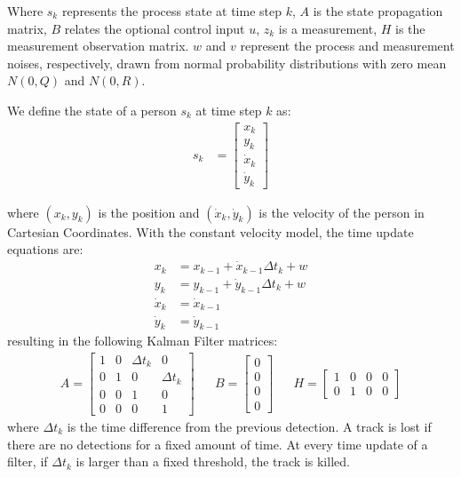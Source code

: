 Where $s_k$ represents the process state at time step $k$, $A$ is the state propagation matrix, $B$ relates the optional control input $u$, $z_k$ is a measurement, $H$ is the measurement observation matrix. $w$ and $v$ represent the process and measurement noises, respectively, drawn from normal probability distributions with zero mean $N(0,Q)$ and $N(0,R)$.

We define the state of a person $s_k$ at time step $k$ as:
\begin{align}
s_k & =
\begin{bmatrix} 
 x_k \\ 
 y_k\\
 \dot{x}_{k} \\
 \dot{y}_{k}
\end{bmatrix}
\end{align}

where $(x_k,y_k)$ is the position and $(\dot{x}_{k}, \dot{y}_{k})$ is the velocity of the person in Cartesian Coordinates. With the constant velocity model, the time update equations are:
\begin{align}
x_k&=x_{k-1}+\dot{x}_{k-1} \Delta t_k + w\\
y_k&=y_{k-1}+\dot{y}_{k-1} \Delta t_k + w\\
\dot{x}_{k}&=\dot{x}_{k-1} \\
\dot{y}_{k}&=\dot{y}_{k-1}
\end{align}
resulting in the following Kalman Filter matrices:
\begin{align}
A =
\begin{bmatrix} 
 1 & 0 &\Delta t_k & 0\\
 0 & 1 & 0 & \Delta t_k\\
 0 & 0 & 1 & 0\\
 0 & 0 & 0 & 1
\end{bmatrix} &&
B =
\begin{bmatrix} 
 0 \\
 0 \\
 0 \\
 0
\end{bmatrix} &&
H =
\begin{bmatrix} 
1 & 0 & 0 & 0 \\
 0 & 1 & 0 & 0
\end{bmatrix} 
\end{align}
where $\Delta t_k$ is the time difference from the previous detection. A track is lost if there are no detections for a fixed amount of time. At every time update of a filter, if $\Delta t_k$ is larger than a fixed threshold, the track is killed.

